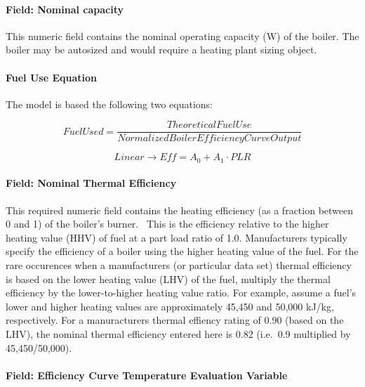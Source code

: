 \paragraph{Field: Nominal capacity}\label{field-nominal-capacity-6}

This numeric field contains the nominal operating capacity (W) of the boiler. The boiler may be autosized and would require a heating plant sizing object.

\paragraph{Fuel Use Equation}\label{fuel-use-equation}

The model is based the following two equations:

\begin{equation}
FuelUsed = \frac{{TheoreticalFuelUse}}{{NormalizedBoilerEfficiencyCurveOutput}}
\end{equation}

\begin{equation}
Linear \to Eff = {A_0} + {A_1}\cdot PLR
\end{equation}

\paragraph{Field: Nominal Thermal Efficiency}\label{field-nominal-thermal-efficiency}

This required numeric field contains the heating efficiency (as a fraction between 0 and 1) of the boiler's burner.~ This is the efficiency relative to the higher heating value (HHV) of fuel at a part load ratio of 1.0. Manufacturers typically specify the efficiency of a boiler using the higher heating value of the fuel. For the rare occurences when a manufacturers (or particular data set) thermal efficiency is based on the lower heating value (LHV) of the fuel, multiply the thermal efficiency by the lower-to-higher heating value ratio. For example, assume a fuel's lower and higher heating values are approximately 45,450 and 50,000 kJ/kg, respectively. For a manuracturers thermal effiency rating of 0.90 (based on the LHV), the nominal thermal efficiency entered here is 0.82 (i.e.~0.9 multiplied by 45,450/50,000).

\paragraph{Field: Efficiency Curve Temperature Evaluation Variable}\label{field-efficiency-curve-temperature-evaluation-variable}

